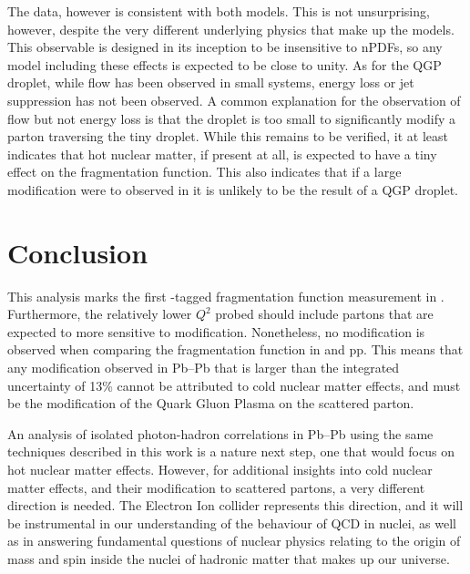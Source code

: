 The data, however is consistent with both models. This is not unsurprising, however, despite the very different underlying physics that make up the models. This observable is designed in its inception to be insensitive to nPDFs, so any model including these effects is expected to be close to unity. As for the QGP droplet, while flow has been observed in small systems, energy loss or jet suppression has not been observed. A common explanation for the observation of flow but not energy loss is that the droplet is too small to significantly modify a parton traversing the tiny droplet. While this remains to be verified, it at least indicates that hot nuclear matter, if present at all, is expected to have a tiny effect on the fragmentation function. This also indicates that if a large modification were to observed in \pPb it is unlikely to be the result of a QGP droplet.

\section{Conclusion}
This analysis marks the first \gammaiso-tagged fragmentation function measurement in \pPb. Furthermore, the relatively lower $Q^2$ probed should include partons that are expected to more sensitive to modification. Nonetheless, no modification is observed when comparing the fragmentation function in \pPb and pp. This means that any modification observed in Pb--Pb that is larger than the integrated uncertainty of 13\% cannot be attributed to cold nuclear matter effects, and must be the modification of the Quark Gluon Plasma on the scattered parton.

An analysis of isolated photon-hadron correlations in Pb--Pb using the same techniques described in this work is a nature next step, one that would focus on hot nuclear matter effects. However, for additional insights into cold nuclear matter effects, and their modification to scattered partons, a very different direction is needed. The Electron Ion collider represents this direction, and it will be instrumental in our understanding of the behaviour of QCD in nuclei, as well as in answering fundamental questions of nuclear physics relating to the origin of mass and spin inside the nuclei of hadronic matter that makes up our universe.



